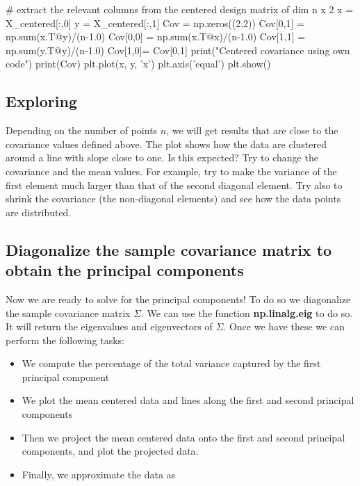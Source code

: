 \documentclass[%
oneside,                 %
final,                   %
10pt]{article}
\begin{document}
\bpycod
# extract the relevant columns from the centered design matrix of dim n x 2
x = X_centered[:,0]
y = X_centered[:,1]
Cov = np.zeros((2,2))
Cov[0,1] = np.sum(x.T@y)/(n-1.0)
Cov[0,0] = np.sum(x.T@x)/(n-1.0)
Cov[1,1] = np.sum(y.T@y)/(n-1.0)
Cov[1,0]= Cov[0,1]
print("Centered covariance using own code")
print(Cov)
plt.plot(x, y, 'x')
plt.axis('equal')
plt.show()

\epycod


\subsection{Exploring}

Depending on the number of points $n$, we will get results that are close to the covariance values defined above.
The plot shows how the data are clustered around a line with slope close to one. Is this expected?  Try to change the covariance and the mean values. For example, try to make the variance of the first element much larger than that of the second diagonal element. Try also to shrink the covariance  (the non-diagonal elements) and see how the data points are distributed. 

\subsection{Diagonalize the sample covariance matrix to obtain the principal components}

Now we are ready to solve for the principal components! To do so we
diagonalize the sample covariance matrix $\Sigma$. We can use the
function \textbf{np.linalg.eig} to do so. It will return the eigenvalues and
eigenvectors of $\Sigma$. Once we have these we can perform the 
following tasks:

\begin{itemize}
\item We compute the percentage of the total variance captured by the first principal component

\item We plot the mean centered data and lines along the first and second principal components

\item Then we project the mean centered data onto the first and second principal components, and plot the projected data. 

\item Finally, we approximate the data as
\end{itemize}
\end{document}

